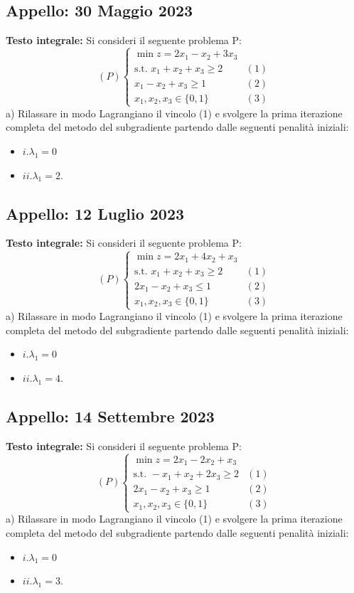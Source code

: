 \documentclass[11pt, a4paper]{article}
\begin{document}
\subsection{Appello: 30 Maggio 2023}
\textbf{Testo integrale:}
Si consideri il seguente problema P:
\[ (P) \begin{cases} \min z = 2x_1 - x_2 + 3x_3 \\ \text{s.t. } x_1 + x_2 + x_3 \ge 2 & (1) \\ x_1 - x_2 + x_3 \ge 1 & (2) \\ x_1, x_2, x_3 \in \{0,1\} & (3) \end{cases} \]
a) Rilassare in modo Lagrangiano il vincolo (1) e svolgere la prima iterazione completa del metodo del subgradiente partendo dalle seguenti penalità iniziali:
\begin{itemize}
    \item $i. \lambda_1 = 0$
    \item $ii. \lambda_1 = 2$.
\end{itemize}

\subsection{Appello: 12 Luglio 2023}
\textbf{Testo integrale:}
Si consideri il seguente problema P:
\[ (P) \begin{cases} \min z = 2x_1 + 4x_2 + x_3 \\ \text{s.t. } x_1 + x_2 + x_3 \ge 2 & (1) \\ 2x_1 - x_2 + x_3 \le 1 & (2) \\ x_1, x_2, x_3 \in \{0,1\} & (3) \end{cases} \]
a) Rilassare in modo Lagrangiano il vincolo (1) e svolgere la prima iterazione completa del metodo del subgradiente partendo dalle seguenti penalità iniziali:
\begin{itemize}
    \item $i. \lambda_1 = 0$
    \item $ii. \lambda_1 = 4$.
\end{itemize}

\subsection{Appello: 14 Settembre 2023}
\textbf{Testo integrale:}
Si consideri il seguente problema P:
\[ (P) \begin{cases} \min z = 2x_1 - 2x_2 + x_3 \\ \text{s.t. } -x_1 + x_2 + 2x_3 \ge 2 & (1) \\ 2x_1 - x_2 + x_3 \ge 1 & (2) \\ x_1, x_2, x_3 \in \{0,1\} & (3) \end{cases} \]
a) Rilassare in modo Lagrangiano il vincolo (1) e svolgere la prima iterazione completa del metodo del subgradiente partendo dalle seguenti penalità iniziali:
\begin{itemize}
    \item $i. \lambda_1 = 0$
    \item $ii. \lambda_1 = 3$.
\end{itemize}
\end{document}
